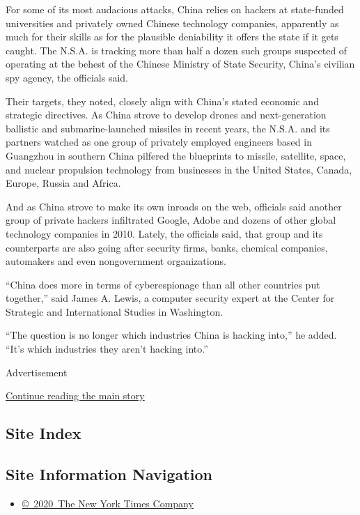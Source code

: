For some of its most audacious attacks, China relies on hackers at
state-funded universities and privately owned Chinese technology
companies, apparently as much for their skills as for the plausible
deniability it offers the state if it gets caught. The N.S.A. is
tracking more than half a dozen such groups suspected of operating at
the behest of the Chinese Ministry of State Security, China's civilian
spy agency, the officials said.

Their targets, they noted, closely align with China's stated economic
and strategic directives. As China strove to develop drones and
next-generation ballistic and submarine-launched missiles in recent
years, the N.S.A. and its partners watched as one group of privately
employed engineers based in Guangzhou in southern China pilfered the
blueprints to missile, satellite, space, and nuclear propulsion
technology from businesses in the United States, Canada, Europe, Russia
and Africa.

And as China strove to make its own inroads on the web, officials said
another group of private hackers infiltrated Google, Adobe and dozens of
other global technology companies in 2010. Lately, the officials said,
that group and its counterparts are also going after security firms,
banks, chemical companies, automakers and even nongovernment
organizations.

``China does more in terms of cyberespionage than all other countries
put together,'' said James A. Lewis, a computer security expert at the
Center for Strategic and International Studies in Washington.

``The question is no longer which industries China is hacking into,'' he
added. ``It's which industries they aren't hacking into.''

Advertisement

\protect\hyperlink{after-bottom}{Continue reading the main story}

\hypertarget{site-index}{%
\subsection{Site Index}\label{site-index}}

\hypertarget{site-information-navigation}{%
\subsection{Site Information
Navigation}\label{site-information-navigation}}

\begin{itemize}
\tightlist
\item
  \href{https://help.nytimes.com/hc/en-us/articles/115014792127-Copyright-notice}{©~2020~The
  New York Times Company}
\end{itemize}

